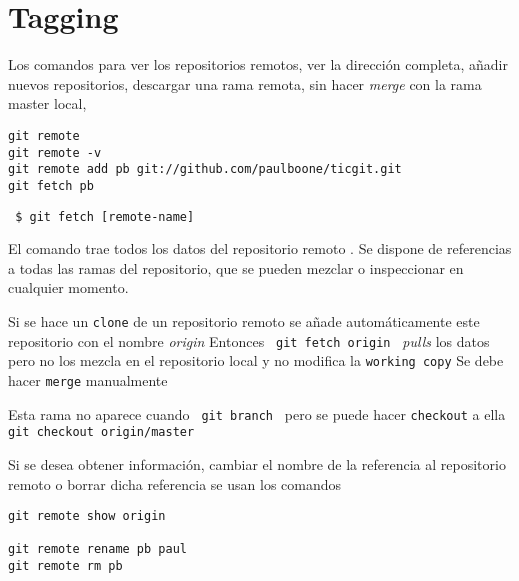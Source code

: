\documentclass[]{article}
\begin{document}
\section{Tagging}
Los comandos para ver los repositorios remotos, ver la dirección completa, añadir nuevos repositorios, descargar una rama remota, sin hacer \textit{merge} con la rama master local, 
\begin{verbatim}
git remote 
git remote -v
git remote add pb git://github.com/paulboone/ticgit.git
git fetch pb
\end{verbatim}

\verb= $ git fetch [remote-name] =

El comando trae todos los datos del repositorio remoto . Se dispone de referencias a todas las ramas del repositorio, que se pueden mezclar o inspeccionar en cualquier momento.

Si se hace un \texttt{clone} de un repositorio remoto se añade automáticamente este repositorio con el nombre \textit{origin} Entonces \verb= git fetch origin = \textit{pulls } los datos pero no los mezcla en el repositorio local y no modifica la \texttt{working copy} Se debe hacer \texttt{merge} manualmente

Esta rama no aparece cuando \verb= git branch = pero se puede hacer \texttt{checkout} a ella \verb= git checkout origin/master =

Si se desea obtener información, cambiar el nombre de la referencia al repositorio remoto o borrar dicha referencia se usan los comandos

\begin{verbatim}
git remote show origin

git remote rename pb paul
git remote rm pb

\end{verbatim}
\end{document}
